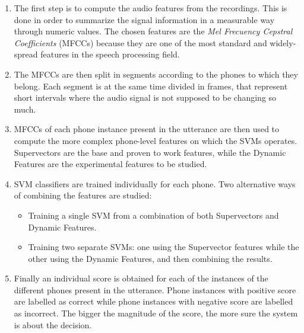 \begin{enumerate}

 \item The first step is to compute the audio features from the recordings.
 This is done in order to summarize the signal information
 in a measurable way through numeric values. The chosen features
 are the \textit{Mel Frecuency Cepstral Coefficients} (MFCCs) because they are one of the
 most standard and widely-spread features in the speech processing field.

 \item The MFCCs are then split in segments according to the phones to which they
 belong. Each segment is at the same time divided in frames, that represent short
 intervals where the audio signal is not supposed to be changing so much.

 \item MFCCs of each phone instance present in the utterance
 are then used to compute the more complex phone-level features
 on which the SVMs operates. Supervectors are the base and proven to work features,
 while the Dynamic Features are the experimental features to be studied.

 \item {
  SVM classifiers are trained individually for each phone. Two alternative ways of combining the
  features are studied:
    \begin{itemize}
      \item Training a single SVM from a combination of both Supervectors and Dynamic Features.
      \item Training two separate SVMs: one using the Supervector features while the other using the
      Dynamic Features, and then combining the results.
    \end{itemize}
 }

 \item Finally an individual score is obtained for each of the instances
 of the different phones present in the
 utterance. Phone instances with positive score are labelled as
 correct while phone instances with negative score are labelled as incorrect.
 The bigger the magnitude of the score, the more sure the system is about the
 decision.

\end{enumerate}

